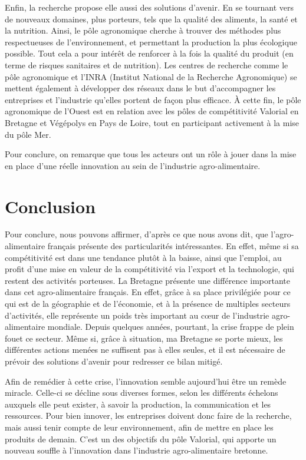 \documentclass[a4paper,12pt]{report}
\begin{document}
			Enfin, la recherche propose elle aussi des solutions d’avenir. En se tournant vers de nouveaux domaines, plus porteurs, tels que la qualité des aliments, la santé et la nutrition. Ainsi, le pôle agronomique cherche à trouver des méthodes plus respectueuses de l’environnement, et permettant la production la plus écologique possible\cite{PoleAgroOuest}. Tout cela a pour intérêt de renforcer à la fois la qualité du produit (en terme de risques sanitaires et de nutrition). Les centres de recherche comme le pôle agronomique et l’INRA (Institut National de la Recherche Agronomique) se mettent également à développer des réseaux dans le but d’accompagner les entreprises et l’industrie qu’elles portent de façon plus efficace. À cette fin, le pôle agronomique de l’Ouest est en relation avec les pôles de compétitivité Valorial en Bretagne et Végépolys en Pays de Loire, tout en participant activement à la mise du pôle Mer\cite{PoleAgroOuest}. 

  			 Pour conclure, on remarque que tous les acteurs ont un rôle à jouer dans la mise en place d’une réelle innovation au sein de l’industrie agro-alimentaire.

\chapter*{Conclusion}
	Pour conclure, nous pouvons affirmer, d’après ce que nous avons dit, que l’agro-alimentaire français présente des particularités intéressantes. En effet, même si sa compétitivité est dans une tendance plutôt à la baisse, ainsi que l’emploi, au profit d’une mise en valeur de la compétitivité via l’export et la technologie, qui restent des activités porteuses. La Bretagne présente une différence importante dans cet agro-alimentaire français. En effet, grâce à sa place privilégiée pour ce qui est de la géographie et de l’économie, et à la présence de multiples secteurs d’activités, elle représente un poids très important au cœur de l’industrie agro-alimentaire mondiale. Depuis quelques années, pourtant, la crise frappe de plein fouet ce secteur. Même si, grâce à situation, ma Bretagne se porte mieux, les différentes actions menées ne suffisent pas à elles seules, et il est nécessaire de prévoir des solutions d’avenir pour redresser ce bilan mitigé.
  
    Afin de remédier à cette crise, l’innovation semble aujourd’hui être un remède miracle.  Celle-ci se décline sous diverses formes, selon les différents échelons auxquels elle peut exister, à savoir la production, la communication et les ressources. Pour bien innover, les entreprises doivent donc faire de la recherche, mais aussi tenir compte de leur environnement, afin de mettre en place les produits de demain. C'est un des objectifs du pôle Valorial, qui apporte un nouveau souffle à l'innovation dans l'industrie agro-alimentaire bretonne.
\end{document}
